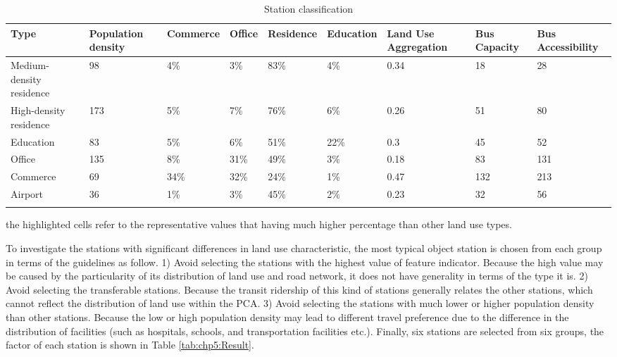 \begin{sidewaystable}[htbp]
	\centering
	\caption{Station classification}
	\label{tab:chp5:StationClassification}
	\small
	\renewcommand{\arraystretch}{1.25} %
	\begin{tabular}{p{12em}<{\raggedright}p{4em}<{\centering}p{4em}<{\centering}p{4em}<{\centering}p{4em}<{\centering}p{4em}<{\centering}p{5em}<{\centering}p{5em}<{\centering}p{5em}<{\centering}}
		
		\Xhline{1.5pt}
		Type & Population density & Commerce & Office & Residence & Education & Land Use Aggregation & Bus Capacity & Bus Accessibility \\
		\midrule
		
		Medium-density residence & 98 & 4\% & 3\% & \cellcolor[rgb]{.8, .8, .8} 83\% & 4\% & 0.34 & 18 & 28 \\
		High-density residence & 173 & 5\% & 7\% & \cellcolor[rgb]{.8, .8, .8} 76\% & 6\% & 0.26 & 51 & 80 \\
		Education & 83 & 5\% & 6\% & 51\% & \cellcolor[rgb]{.8, .8, .8} 22\% & 0.3 & 45 & 52 \\
		Office & 135 & 8\% & \cellcolor[rgb]{.8, .8, .8} 31\% & 49\% & 3\% & 0.18 & 83 & 131 \\
		Commerce & 69 & \cellcolor[rgb]{.8, .8, .8} 34\% & \cellcolor[rgb]{.8, .8, .8} 32\% & 24\% & 1\% & 0.47 & 132 & 213 \\
		Airport & 36 & 1\% & 3\% & 45\% & 2\% & 0.23 & 32 & 56 \\
		\Xhline{1.5pt}
		
	\end{tabular}
	\begin{description}
		\small
		\label{note:tab:chp5:StationClassification}
		\item[Note:] the highlighted cells refer to the representative values that having much higher percentage than other land use types.
	\end{description}
	
\end{sidewaystable}

%
To investigate the stations with significant differences in land use characteristic, the most typical object station is chosen from each group in terms of the guidelines as follow. 1) Avoid selecting the stations with the highest value of feature indicator. Because the high value may be caused by the particularity of its distribution of land use and road network, it does not have generality in terms of the type it is. 2) Avoid selecting the transferable stations. Because the transit ridership of this kind of stations generally relates the other stations, which cannot reflect the distribution of land use within the PCA. 3) Avoid selecting the stations with much lower or higher population density than other stations. Because the low or high population density may lead to different travel preference due to the difference in the distribution of facilities (such as hospitals, schools, and transportation facilities etc.). Finally, six stations are selected from six groups, the factor of each station is shown in Table \ref{tab:chp5:Result}.

